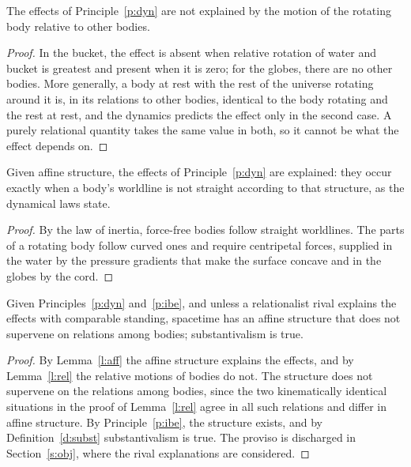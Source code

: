 \documentclass{situationist-preprint}
\begin{document}
\begin{lemma}\label{l:rel}
The effects of Principle~\ref{p:dyn} are not explained by the motion of the rotating body relative to other bodies.
\end{lemma}

\begin{proof}
In the bucket, the effect is absent when relative rotation of water and bucket is greatest and present when it is zero; for the globes, there are no other bodies. More generally, a body at rest with the rest of the universe rotating around it is, in its relations to other bodies, identical to the body rotating and the rest at rest, and the dynamics predicts the effect only in the second case. A purely relational quantity takes the same value in both, so it cannot be what the effect depends on.
\end{proof}

\begin{lemma}\label{l:aff}
Given affine structure, the effects of Principle~\ref{p:dyn} are explained: they occur exactly when a body's worldline is not straight according to that structure, as the dynamical laws state.
\end{lemma}

\begin{proof}
By the law of inertia, force-free bodies follow straight worldlines. The parts of a rotating body follow curved ones and require centripetal forces, supplied in the water by the pressure gradients that make the surface concave and in the globes by the cord.
\end{proof}

\begin{theorem}\label{t:main}
Given Principles~\ref{p:dyn} and~\ref{p:ibe}, and unless a relationalist rival explains the effects with comparable standing, spacetime has an affine structure that does not supervene on relations among bodies; substantivalism is true.
\end{theorem}

\begin{proof}
By Lemma~\ref{l:aff} the affine structure explains the effects, and by Lemma~\ref{l:rel} the relative motions of bodies do not. The structure does not supervene on the relations among bodies, since the two kinematically identical situations in the proof of Lemma~\ref{l:rel} agree in all such relations and differ in affine structure. By Principle~\ref{p:ibe}, the structure exists, and by Definition~\ref{d:subst} substantivalism is true. The proviso is discharged in Section~\ref{s:obj}, where the rival explanations are considered.
\end{proof}
\end{document}
